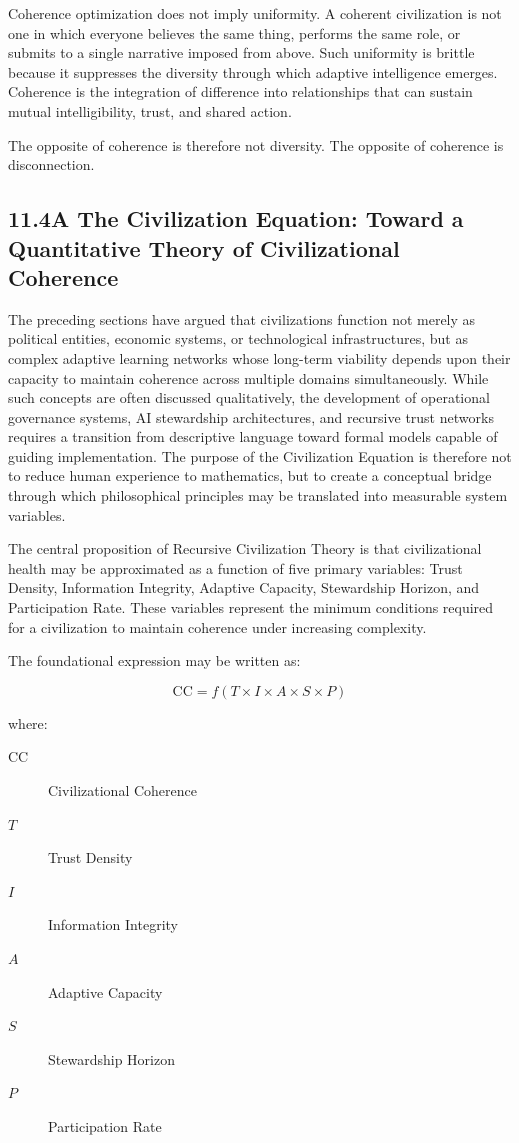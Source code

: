 \documentclass[12pt]{article}
\begin{document}
Coherence optimization does not imply uniformity. A coherent civilization is not one in which everyone believes the same thing, performs the same role, or submits to a single narrative imposed from above. Such uniformity is brittle because it suppresses the diversity through which adaptive intelligence emerges. Coherence is the integration of difference into relationships that can sustain mutual intelligibility, trust, and shared action.

The opposite of coherence is therefore not diversity. The opposite of coherence is disconnection.

\subsection*{11.4A The Civilization Equation: Toward a Quantitative Theory of Civilizational Coherence}

The preceding sections have argued that civilizations function not merely as political entities, economic systems, or technological infrastructures, but as complex adaptive learning networks whose long-term viability depends upon their capacity to maintain coherence across multiple domains simultaneously. While such concepts are often discussed qualitatively, the development of operational governance systems, AI stewardship architectures, and recursive trust networks requires a transition from descriptive language toward formal models capable of guiding implementation. The purpose of the Civilization Equation is therefore not to reduce human experience to mathematics, but to create a conceptual bridge through which philosophical principles may be translated into measurable system variables.

The central proposition of Recursive Civilization Theory is that civilizational health may be approximated as a function of five primary variables: Trust Density, Information Integrity, Adaptive Capacity, Stewardship Horizon, and Participation Rate. These variables represent the minimum conditions required for a civilization to maintain coherence under increasing complexity.

The foundational expression may be written as:

\[
\mathrm{CC}=f(T \times I \times A \times S \times P)
\]

where:

\begin{description}
  \item[\(\mathrm{CC}\)] Civilizational Coherence
  \item[\(T\)] Trust Density
  \item[\(I\)] Information Integrity
  \item[\(A\)] Adaptive Capacity
  \item[\(S\)] Stewardship Horizon
  \item[\(P\)] Participation Rate
\end{description}
\end{document}
